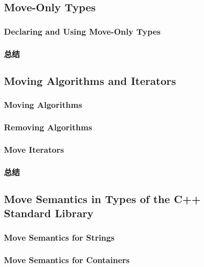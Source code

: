 \documentclass[11pt,a4paper,UTF8]{ctexart}
\begin{document}
	\subsection{Move-Only Types}
		\subsubsection{Declaring and Using Move-Only Types}
		\subsubsection{总结}
	\subsection{Moving Algorithms and Iterators}
		\subsubsection{Moving Algorithms}
		\subsubsection{Removing Algorithms}
		\subsubsection{Move Iterators}
		\subsubsection{总结}
	\subsection{Move Semantics in Types of the C++ Standard Library}
		\subsubsection{Move Semantics for Strings}
		\subsubsection{Move Semantics for Containers}
\end{document}
